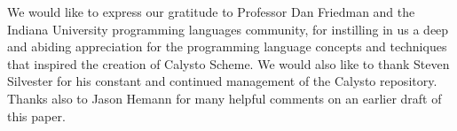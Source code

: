 \documentclass[acmsmall,screen,authorversion]{acmart}
\begin{document}
\begin{acks}
We would like to express our gratitude to Professor Dan Friedman and the
Indiana University programming languages community, for instilling in us a deep
and abiding appreciation for the programming language concepts and techniques
that inspired the creation of Calysto Scheme.  We would also like to thank
Steven Silvester for his constant and continued management of the Calysto
repository. Thanks also to Jason Hemann for many helpful comments on an earlier
draft of this paper.
\end{acks}



\end{document}
